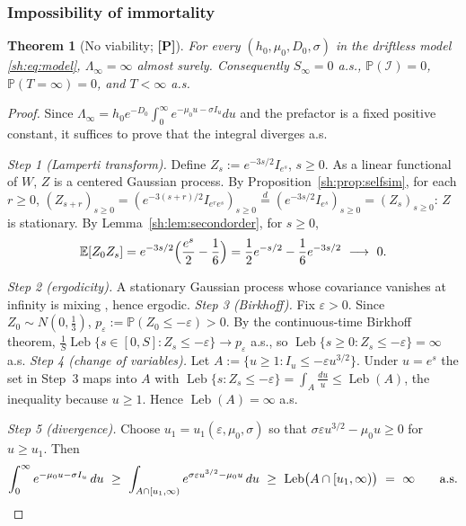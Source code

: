 \documentclass[11pt]{article}
\numberwithin{equation}{section}
\theoremstyle{plain}
\newtheorem{theorem}{Theorem}[section]
\theoremstyle{definition}
\theoremstyle{remark}
\newcommand{\E}{\mathbb{E}}
\newcommand{\PP}{\mathbb{P}}
\DeclareMathOperator{\Leb}{Leb}
\newcommand{\eqd}{\overset{d}{=}}
\newcommand{\Imm}{\mathcal{I}}
\begin{document}
\subsubsection{Impossibility of immortality}\label{sh:subsub:noimm}

\begin{theorem}[No viability; \textbf{[P]}]\label{sh:thm:noimm}
For every $(h_0,\mu_0,D_0,\sigma)$ in the driftless model
\eqref{sh:eq:model}, $\Lambda_\infty=\infty$ almost surely. Consequently
$S_\infty=0$ a.s., $\PP(\Imm)=0$, $\PP(T=\infty)=0$, and $T<\infty$ a.s.
\end{theorem}

\begin{proof}
Since $\Lambda_\infty=h_0e^{-D_0}\int_0^\infty e^{-\mu_0u-\sigma I_u}du$
and the prefactor is a fixed positive constant, it suffices to prove that
the integral diverges a.s.

\emph{Step 1 (Lamperti transform).} Define $Z_s:=e^{-3s/2}I_{e^s}$,
$s\ge0$. As a linear functional of $W$, $Z$ is a centered Gaussian process.
By Proposition~\ref{sh:prop:selfsim}, for each $r\ge0$,
$(Z_{s+r})_{s\ge0}=(e^{-3(s+r)/2}I_{e^re^s})_{s\ge0}
\eqd(e^{-3s/2}I_{e^s})_{s\ge0}=(Z_s)_{s\ge0}$: $Z$ is stationary. By
Lemma~\ref{sh:lem:secondorder}, for $s\ge0$,
\begin{equation}\label{sh:eq:lampcov}
\E[Z_0Z_s]=e^{-3s/2}\Bigl(\frac{e^{s}}{2}-\frac16\Bigr)
=\frac12e^{-s/2}-\frac16e^{-3s/2}\ \longrightarrow\ 0 .
\end{equation}

\emph{Step 2 (ergodicity).} A stationary Gaussian process whose covariance
vanishes at infinity is mixing \cite{Mar49}, hence ergodic. \emph{Step 3 (Birkhoff).} Fix $\varepsilon>0$. Since
$Z_0\sim N(0,\tfrac13)$, $p_\varepsilon:=\PP(Z_0\le-\varepsilon)>0$. By the
continuous-time Birkhoff theorem,
$\tfrac1S\Leb\{s\in[0,S]:Z_s\le-\varepsilon\}\to p_\varepsilon$ a.s., so
$\Leb\{s\ge0:Z_s\le-\varepsilon\}=\infty$ a.s. \emph{Step 4 (change of variables).} Let
$A:=\{u\ge1:I_u\le-\varepsilon u^{3/2}\}$. Under $u=e^s$ the set in Step~3
maps into $A$ with
$\Leb\{s:Z_s\le-\varepsilon\}=\int_A\frac{du}{u}\le\Leb(A)$,
the inequality because $u\ge1$. Hence $\Leb(A)=\infty$ a.s.

\emph{Step 5 (divergence).} Choose $u_1=u_1(\varepsilon,\mu_0,\sigma)$ so
that $\sigma\varepsilon u^{3/2}-\mu_0u\ge0$ for $u\ge u_1$. Then
\[
\int_0^\infty e^{-\mu_0u-\sigma I_u}\,du
\ \ge\ \int_{A\cap[u_1,\infty)}e^{\sigma\varepsilon u^{3/2}-\mu_0u}\,du
\ \ge\ \Leb\bigl(A\cap[u_1,\infty)\bigr)\ =\ \infty
\qquad\text{a.s.}\qedhere
\]
\end{proof}
\end{document}
